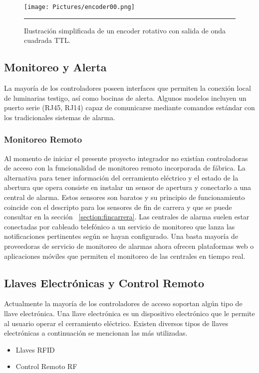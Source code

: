 \begin{figure}[htbp]
	\centering
	\texttt{[image: Pictures/encoder00.png]}
	\rule{35em}{1pt}
	\caption[Encoder Rotativo]{Ilustración simplificada de un encoder rotativo con salida de onda cuadrada TTL. }
	\label{fig:encoder00}
\end{figure}


\subsection{Monitoreo y Alerta}
La mayoría de los controladores poseen interfaces que permiten la conexión local de luminarias testigo, así como bocinas de alerta. Algunos modelos incluyen un puerto serie (RJ45, RJ14) capaz de comunicarse mediante comandos estándar con los tradicionales sistemas de alarma.

\subsubsection{Monitoreo Remoto}
Al momento de iniciar el presente proyecto integrador no existían controladoras de acceso con la funcionalidad de monitoreo remoto incorporada de fábrica.
La alternativa para tener información del cerramiento eléctrico y el estado de la abertura que opera consiste en instalar un sensor de apertura y conectarlo a una central de alarma. Estos sensores son baratos y su principio de funcionamiento coincide con el descripto para los sensores de fin de carrera y que se puede consultar en la sección ~\ref{section:fincarrera}.
Las centrales de alarma suelen estar conectadas por cableado telefónico a un servicio de monitoreo que lanza las notificaciones pertinentes según se hayan configurado.
Una basta mayoría de proveedoras de servicio de monitoreo de alarmas ahora ofrecen plataformas web o aplicaciones móviles que permiten el monitoreo de las centrales en tiempo real.

\subsection{Llaves Electrónicas y Control Remoto}
\label{section:llaves_electronicas}
Actualmente la mayoría de los controladores de acceso soportan algún tipo de llave electrónica.
Una llave electrónica es un dispositivo electrónico que le permite al usuario operar el cerramiento eléctrico. Existen diversos tipos de llaves electrónicas a continuación se mencionan las más utilizadas.
\begin{itemize}
	\item Llaves RFID
	\item Control Remoto RF
\end{itemize}

